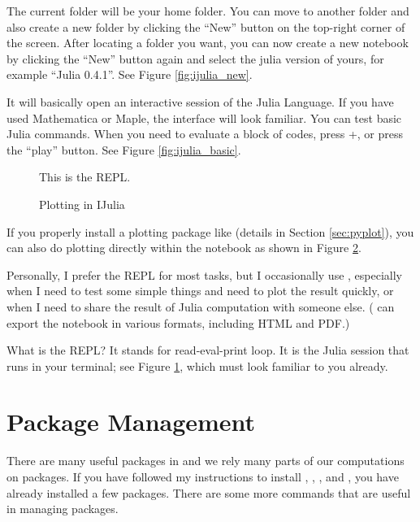 The current folder will be your home folder. You can move to another folder and also create a new folder by clicking the ``New'' button on the top-right corner of the screen. After locating a folder you want, you can now create a new  notebook by clicking the ``New'' button again and select the julia version of yours, for example ``Julia 0.4.1''. See Figure \ref{fig:ijulia_new}.


It will basically open an interactive session of the Julia Language. If you have used Mathematica or Maple, the interface will look familiar. You can test basic Julia commands. When you need to evaluate a block of codes, press +, or press the ``play'' button. See Figure \ref{fig:ijulia_basic}.

\begin{figure}
\caption{This is the REPL.\label{fig:repl}}
\end{figure}

\begin{figure}
\caption{Plotting in IJulia\label{fig:ijulia_pyplot}}
\end{figure}


If you properly install a plotting package like  (details in Section \ref{sec:pyplot}), you can also do plotting directly within the  notebook as shown in Figure \ref{fig:ijulia_pyplot}.


Personally, I prefer the REPL for most tasks, but I occasionally use , especially when I need to test some simple things and need to plot the result quickly, or when I need to share the result of Julia computation with someone else. ( can export the notebook in various formats, including HTML and PDF.)

What is the REPL? It stands for read-eval-print loop. It is the Julia session that runs in your terminal; see Figure \ref{fig:repl}, which must look familiar to you already.







\section{Package Management}

There are many useful packages in \julia{} and we rely many parts of our computations on packages. If you have followed my instructions to install \julia{}, \jump{}, \gurobi{}, and \cplex{}, you have already installed a few packages. There are some more commands that are useful in managing packages.

